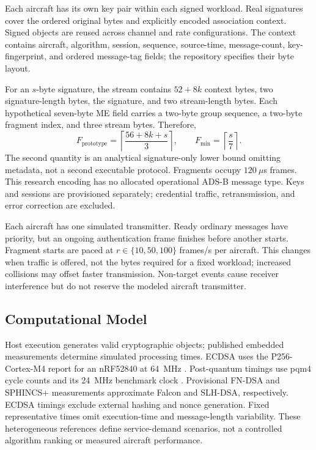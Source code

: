 Each aircraft has its own key pair within each signed workload. Real
signatures cover the ordered original bytes and explicitly encoded
association context. Signed objects are reused across channel and rate
configurations. The context contains aircraft, algorithm, session, sequence,
source-time, message-count, key-fingerprint, and ordered message-tag fields;
the repository specifies their byte layout.

For an $s$-byte signature, the stream contains $52+8k$ context bytes, two
signature-length bytes, the signature, and two stream-length bytes. Each
hypothetical seven-byte ME field carries a two-byte group sequence, a
two-byte fragment index, and three stream bytes. Therefore,
\[
 F_{\mathrm{prototype}}=\left\lceil\frac{56+8k+s}{3}\right\rceil,
 \qquad F_{\min}=\left\lceil\frac{s}{7}\right\rceil.
\]
The second quantity is an analytical signature-only lower bound omitting
metadata, not a second executable protocol. Fragments occupy
$120~\mu$s frames. This research encoding has no allocated operational
ADS-B message type. Keys and sessions are provisioned separately;
credential traffic, retransmission, and error correction are excluded.

Each aircraft has one simulated transmitter. Ready ordinary messages have
priority, but an ongoing authentication frame finishes before another
starts. Fragment starts are paced at $r\in\{10,50,100\}$ frames/s per
aircraft. This changes when traffic is offered, not the bytes required for
a fixed workload; increased collisions may offset faster transmission.
Non-target events cause receiver interference but do not reserve the
modeled aircraft transmitter.

\subsection{Computational Model}
\label{subsec:computational-model}

Host execution generates valid cryptographic objects; published embedded
measurements determine simulated processing times. ECDSA uses the
P256-Cortex-M4 report for an nRF52840 at 64~MHz \cite{P256CortexM4}.
Post-quantum timings use pqm4 cycle counts and its 24~MHz benchmark clock
\cite{PQM4Benchmarks,PQM4Platform}. Provisional FN-DSA and SPHINCS+
measurements approximate Falcon and SLH-DSA, respectively. ECDSA timings
exclude external hashing and nonce generation. Fixed representative times
omit execution-time and message-length variability. These heterogeneous
references define service-demand scenarios, not a controlled algorithm
ranking or measured aircraft performance.

